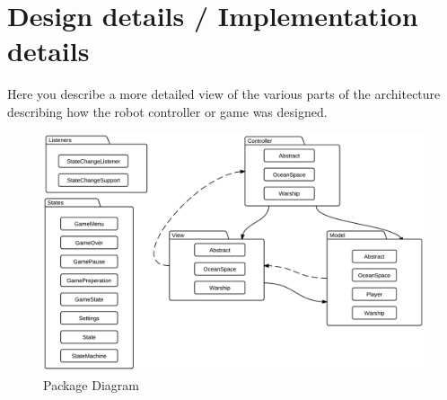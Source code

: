 \chapter{Design details / Implementation details}

Here you describe a more detailed view of the various parts of the 
architecture describing how the robot controller or game was designed.



\begin{figure}[ht]
    \includegraphics[width=\textwidth]{img/PackageDiagram.png}
    \caption{Package Diagram}
    \label{fig:PackageDiagram}
\end{figure}
